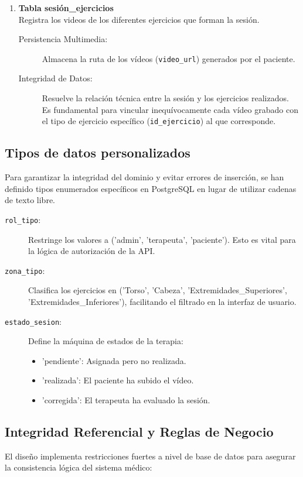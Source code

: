 \begin{enumerate}
    \item \textbf{Tabla sesión\_ejercicios} \\
    Registra los videos de los diferentes ejercicios que forman la sesión.
    \begin{description}
        \item[Persistencia Multimedia:] Almacena la ruta de los vídeos (\texttt{video\_url}) generados por el paciente.
        \item[Integridad de Datos:] Resuelve la relación técnica entre la sesión y los ejercicios realizados. Es fundamental para vincular inequívocamente cada vídeo grabado con el tipo de ejercicio específico (\texttt{id\_ejercicio}) al que corresponde.
    \end{description}
\end{enumerate}

\subsection{Tipos de datos personalizados}
Para garantizar la integridad del dominio y evitar errores de inserción, se han definido tipos enumerados específicos en PostgreSQL en lugar de utilizar cadenas de texto libre.

\begin{description}
    \item[\texttt{rol\_tipo}:] Restringe los valores a ('admin', 'terapeuta', 'paciente'). Esto es vital para la lógica de autorización de la API.
    
    \item[\texttt{zona\_tipo}:] Clasifica los ejercicios en ('Torso', 'Cabeza', 'Extremidades\_Superiores', 'Extremidades\_Inferiores'), facilitando el filtrado en la interfaz de usuario.
    
    \item[\texttt{estado\_sesion}:] Define la máquina de estados de la terapia:
    \begin{itemize}
        \item 'pendiente': Asignada pero no realizada.
        \item 'realizada': El paciente ha subido el vídeo.
        \item 'corregida': El terapeuta ha evaluado la sesión.
    \end{itemize}
\end{description}

\subsection{Integridad Referencial y Reglas de Negocio}
El diseño implementa restricciones fuertes a nivel de base de datos para asegurar la consistencia lógica del sistema médico:


